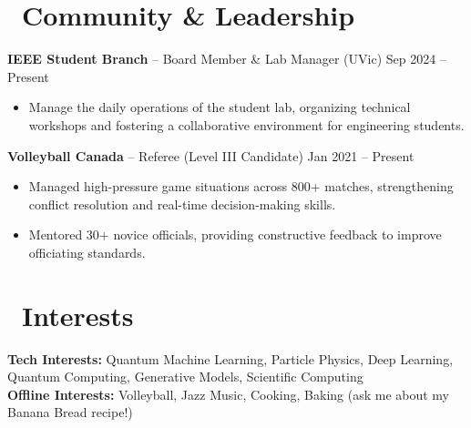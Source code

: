 \documentclass[11pt]{article}
\begin{document}
\vspace{10pt}

\section*{\faUsers\ Community \& Leadership}

\textbf{IEEE Student Branch} -- Board Member \& Lab Manager (UVic) \hfill Sep 2024 -- Present
\begin{itemize}
    \item Manage the daily operations of the student lab, organizing technical workshops and fostering a collaborative environment for engineering students.
\end{itemize}

\vspace{4pt}

\textbf{Volleyball Canada} -- Referee (Level III Candidate) \hfill Jan 2021 -- Present
\begin{itemize}
    \item Managed high-pressure game situations across 800+ matches, strengthening conflict resolution and real-time decision-making skills.
    \item Mentored 30+ novice officials, providing constructive feedback to improve officiating standards.
\end{itemize}

\vspace{4pt}



\vspace{10pt}

\section*{\faHeart\ Interests}
\textbf{Tech Interests:} Quantum Machine Learning, Particle Physics, Deep Learning, Quantum Computing, Generative Models, Scientific Computing \\
\textbf{Offline Interests:} Volleyball, Jazz Music, Cooking, Baking (ask me about my Banana Bread recipe!)
\end{document}
